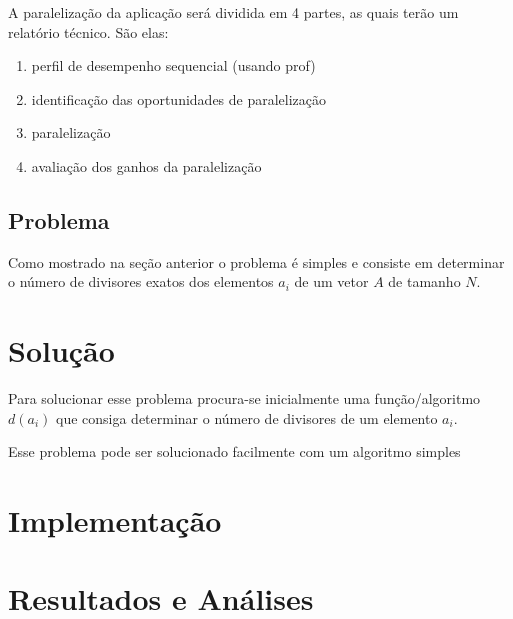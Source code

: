 \documentclass{article}
\begin{document}
A paralelização da aplicação será dividida em 4 partes, as quais terão um relatório técnico. São elas:
\begin{enumerate}
	\item perfil de desempenho sequencial (usando prof)
	\item identificação das oportunidades de paralelização
	\item paralelização
	\item avaliação dos ganhos da paralelização
\end{enumerate}

\subsection{Problema}

Como mostrado na seção anterior o 
problema é simples e consiste em determinar o número de divisores exatos dos elementos $a_i$ de um vetor $A$ de tamanho $N$.

\section{Solução}

Para solucionar esse problema procura-se inicialmente uma função/algoritmo $d(a_i)$ que consiga determinar o número de divisores de um elemento $a_i$.

Esse problema pode ser solucionado facilmente com um algoritmo simples

\section{Implementação}

\section{Resultados e Análises}





\end{document}
